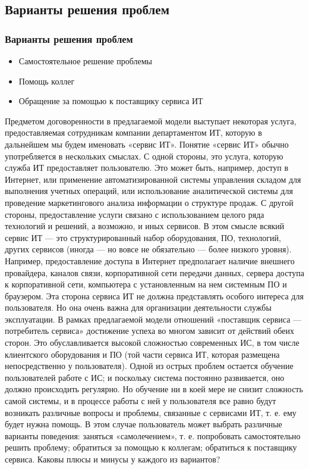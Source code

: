 \documentclass{../industrial-development}
\begin{document}
\subsection{Варианты решения проблем}
\begin{frame} \frametitle{Варианты решения проблем}
	\begin{itemize} 
		\item Самостоятельное решение проблемы
		\item Помощь коллег
		\item Обращение за помощью к поставщику сервиса ИТ 
	\end{itemize}
\end{frame}

\lecturenotes
Предметом договоренности в предлагаемой модели выступает некоторая услуга, предоставляемая сотрудникам компании департаментом ИТ, которую в дальнейшем мы будем именовать «сервис ИТ». 
Понятие «сервис ИТ» обычно употребляется в нескольких смыслах. С одной стороны, это услуга, которую служба ИТ предоставляет пользователю. Это может быть, например, доступ в Интернет, или применение автоматизированной системы управления складом для выполнения учетных операций, или использование аналитической системы для проведение маркетингового анализа информации о структуре продаж. С другой стороны, предоставление услуги связано с использованием целого ряда технологий и решений, а возможно, и иных сервисов. В этом смысле всякий сервис ИТ — это структурированный набор оборудования, ПО, технологий, других сервисов (иногда — но вовсе не обязательно — более низкого уровня). Например, предоставление доступа в Интернет предполагает наличие внешнего провайдера, каналов связи, корпоративной сети передачи данных, сервера доступа к корпоративной сети, компьютера с установленным на нем системным ПО и браузером. Эта сторона сервиса ИТ не должна представлять особого интереса для пользователя. Но она очень важна для организации деятельности службы эксплуатации. 
В рамках предлагаемой модели отношений «поставщик сервиса — потребитель сервиса» достижение успеха во многом зависит от действий обеих сторон. Это обуславливается высокой сложностью современных ИС, в том числе клиентского оборудования и ПО (той части сервиса ИТ, которая размещена непосредственно у пользователя). Одной из острых проблем остается обучение пользователей работе с ИС; и поскольку система постоянно развивается, оно должно происходить регулярно. Но обучение ни в коей мере не снизит сложность самой системы, и в процессе работы с ней у пользователя все равно будут возникать различные вопросы и проблемы, связанные с сервисами ИТ, т. е. ему будет нужна помощь. 
В этом случае пользователь может выбрать различные варианты поведения: заняться «самолечением», т. е. попробовать самостоятельно решить проблему; обратиться за помощью к коллегам; обратиться к поставщику сервиса. Каковы плюсы и минусы у каждого из вариантов? 
\end{document}
